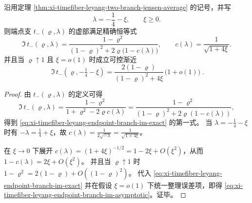 \begin{proposition}\label{prop:xi-timefiber-leyang-endpoint-branch-scaling}
沿用定理 \ref{thm:xi-timefiber-leyang-two-branch-jensen-average} 的记号，并写
\[
\lambda=-\frac14-\xi,\qquad \xi\ge 0.
\]
则端点支 \(t_{-}(\varrho,\lambda)\) 的虚部满足精确恒等式
\begin{equation}\label{eq:xi-timefiber-leyang-endpoint-branch-im-exact}
\Im\,t_{-}(\varrho,\lambda)
=\frac{1-\varrho^2}{(1-\varrho)^2+2\varrho\bigl(1-c(\lambda)\bigr)},
\qquad
c(\lambda)=\frac{1}{\sqrt{1+4\xi}}.
\end{equation}
并且当 \(\varrho\uparrow 1\) 且 \(\xi=o(1)\) 时成立可控渐近
\begin{equation}\label{eq:xi-timefiber-leyang-endpoint-branch-im-asymptotic}
\boxed{\;
\Im\,t_{-}\!\left(\varrho,-\tfrac14-\xi\right)
=\frac{2(1-\varrho)}{(1-\varrho)^2+4\xi}\,\bigl(1+o(1)\bigr)\; }.
\end{equation}
\end{proposition}
\begin{proof}
由 \(t_{-}(\varrho,\lambda)\) 的定义可得
\[
\Im\,t_{-}(\varrho,\lambda)
=\frac{1-\varrho^2}{1+\varrho^2-2\varrho c(\lambda)}
=\frac{1-\varrho^2}{(1-\varrho)^2+2\varrho(1-c(\lambda))},
\]
得到 \eqref{eq:xi-timefiber-leyang-endpoint-branch-im-exact} 的第一式。
当 \(\lambda=-\tfrac14-\xi\) 时有 \(-\lambda=\tfrac14+\xi\)，故
\(
c(\lambda)=\frac{1}{2\sqrt{-\lambda}}=\frac{1}{\sqrt{1+4\xi}}
\)。
\par
在 \(\xi\to 0\) 下展开 \(c(\lambda)=(1+4\xi)^{-1/2}=1-2\xi+O(\xi^2)\)，从而
\(
1-c(\lambda)=2\xi+O(\xi^2)
\)。
并且当 \(\varrho\uparrow 1\) 时 \(1-\varrho^2=2(1-\varrho)+O((1-\varrho)^2)\)。
代入 \eqref{eq:xi-timefiber-leyang-endpoint-branch-im-exact} 并在假设 \(\xi=o(1)\) 下统一整理误差项，即得 \eqref{eq:xi-timefiber-leyang-endpoint-branch-im-asymptotic}。证毕。
\end{proof}

\endinput
